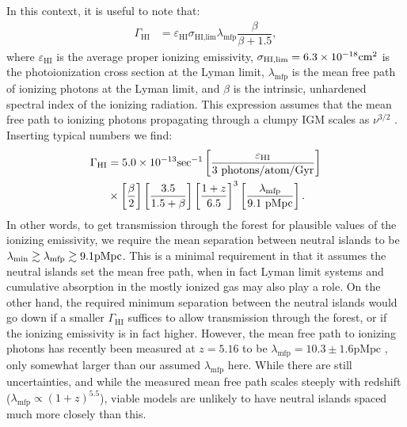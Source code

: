 In this context, it is useful to note that:
\begin{align}
\Gamma_{\text{HI}} &= \varepsilon_{\text{HI}} \sigma_{\text{HI,lim}} \lambda_{\text{mfp}} \dfrac{\beta}{\beta + 1.5},
\end{align}
where $\varepsilon_{\text{HI}}$ is the average proper ionizing emissivity, $\sigma_{\text{HI,lim}} = 6.3 \times 10^{-18}\text{cm}^{2}$ is the photoionization cross section at the Lyman limit, $\lambda_{\text{mfp}}$ is the mean free path of ionizing photons at the Lyman limit, and $\beta$ is the intrinsic, unhardened spectral index of the ionizing radiation.  This expression assumes that the mean free path to ionizing photons
propagating through a clumpy IGM scales as $\nu^{3/2}$ \citep{Zuo}.
Inserting typical numbers we find:
\begin{align}
\Gamma_{\text{HI}} &= \pow{5.0}{-13} \text{sec}^{-1} \left[ \dfrac{\varepsilon_{\text{HI}}}{3\ \text{photons}/\text{atom}/\text{Gyr}}  \right]\\
& \times \left[ \dfrac{\beta}{2} \right] \left[ \dfrac{3.5}{1.5 + \beta} \right] \left[ \dfrac{1 + z}{6.5} \right]^{3} \left[ \dfrac{\lambda_{\text{mfp}}}{9.1 \ \text{pMpc}} \right].
\end{align}
In other words, to get transmission through the forest for plausible values of the ionizing emissivity, we require the mean separation between neutral islands to be
$\lambda_{\rm min} \gtrsim \lambda_{\text{mfp}} \gtrsim 9.1 {\text{pMpc}}$. This is a minimal requirement in that it assumes  the neutral islands set the mean free path, when in fact
Lyman limit systems and cumulative absorption in the mostly ionized gas may also play a role. On the other hand, the required minimum separation between the neutral islands would 
go down if a smaller $\Gamma_{\text{HI}}$ suffices to allow transmission through the forest, or if the ionizing emissivity is in fact higher. 
However, the mean free path to ionizing photons has
recently been measured at $z = 5.16$ to be $\lambda_{\text{mfp}} = 10.3 \pm 1.6 \text{pMpc}$ \citep{Worseck:2014fya}, only somewhat larger than our assumed $\lambda_{\text{mfp}}$ here. While there are still uncertainties, and while the measured mean free path scales steeply with redshift ($\lambda_{\text{mfp}} \propto (1+z)^{5.5}$), viable models are unlikely to have neutral islands spaced much more closely than this. 



